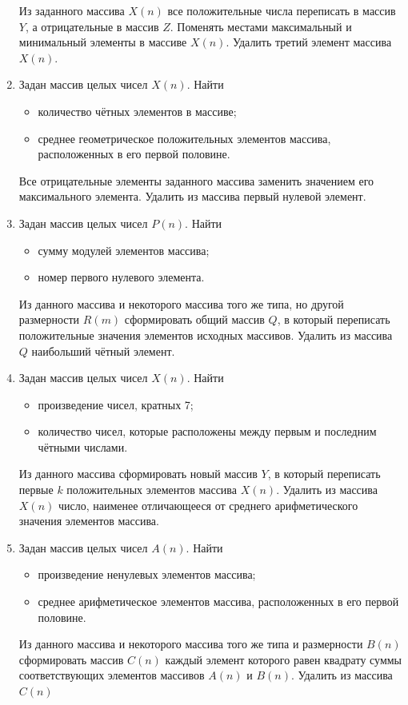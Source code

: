 \begin{enumerate}
Из заданного массива $X(n)$ все положительные числа переписать в массив
$Y$, а отрицательные в массив $Z$. Поменять местами максимальный и минимальный элементы
в массиве $X(n)$. Удалить третий элемент массива $X(n)$.
\item Задан массив целых чисел $X(n)$. Найти
\begin{itemize}
\item количество чётных элементов в массиве;
\item среднее геометрическое положительных элементов массива, расположенных в его первой половине.
\end{itemize}
Все отрицательные элементы заданного массива заменить значением его максимального элемента. Удалить из массива
первый нулевой элемент.
\item Задан массив целых чисел $P(n)$. Найти
\begin{itemize}
\item сумму модулей элементов массива;
\item номер первого нулевого элемента.
\end{itemize}
Из данного массива и некоторого массива того же типа, но другой размерности $R(m)$
сформировать общий массив $Q$, в который переписать положительные значения элементов исходных массивов. Удалить
из массива $Q$ наибольший чётный элемент.
\item Задан массив целых чисел $X(n)$. Найти
\begin{itemize}
\item произведение чисел, кратных 7;
\item количество чисел, которые расположены между первым и последним чётными числами.
\end{itemize}
Из данного массива сформировать новый массив $Y$, в который переписать первые $k$
положительных элементов массива $X(n)$. Удалить из массива $X(n)$
число, наименее отличающееся от среднего арифметического значения элементов массива.
\item Задан массив целых чисел $A(n)$. Найти
\begin{itemize}
\item произведение ненулевых элементов массива;
\item среднее арифметическое элементов массива, расположенных в его первой половине.
\end{itemize}
Из данного массива и некоторого массива того же типа и размерности $B(n)$ сформировать
массив $C(n)$ каждый элемент которого равен квадрату суммы соответствующих элементов массивов
$A(n)$ и $B(n)$. Удалить из массива $C(n)$

\end{enumerate}
